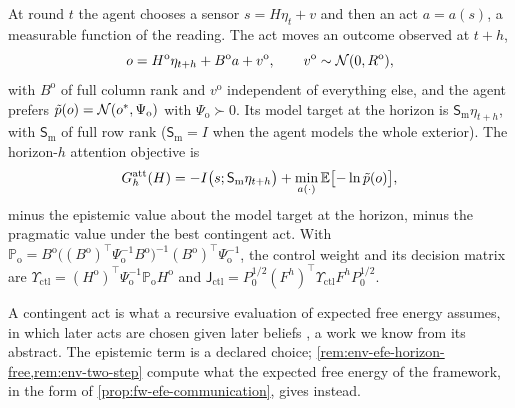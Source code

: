 \begin{definition}\label{def:env-attention-objective}
At round $t$ the agent chooses a sensor $s=H\eta_t+v$ and then an act $a=a(s)$, a measurable function of the reading. The act moves an outcome observed at $t+h$,
\[
o=H^{\mathrm o}\eta_{t+h}+B^{\mathrm o}a+v^{\mathrm o},\qquad v^{\mathrm o}\sim\mathcal{N}(0,R^{\mathrm o}),
\]
with $B^{\mathrm o}$ of full column rank and $v^{\mathrm o}$ independent of everything else, and the agent prefers $\tilde p(o)=\mathcal{N}(o^\ast,\Psi_{\mathrm o})$ with $\Psi_{\mathrm o}\succ0$. Its model target at the horizon is $\mathsf S_{\mathrm m}\eta_{t+h}$, with $\mathsf S_{\mathrm m}$ of full row rank ($\mathsf S_{\mathrm m}=I$ when the agent models the whole exterior). The horizon-$h$ attention objective is
\[
G^{\mathrm{att}}_h(H)=-I\bigl(s;\mathsf S_{\mathrm m}\eta_{t+h}\bigr)+\min_{a(\cdot)}\mathbb{E}\bigl[-\ln\tilde p(o)\bigr],
\]
minus the epistemic value about the model target at the horizon, minus the pragmatic value under the best contingent act. With $\mathbb P_{\mathrm o}=B^{\mathrm o}\bigl((B^{\mathrm o})^\top\Psi_{\mathrm o}^{-1}B^{\mathrm o}\bigr)^{-1}(B^{\mathrm o})^\top\Psi_{\mathrm o}^{-1}$, the control weight and its decision matrix are $\Upsilon_{\mathrm{ctl}}=(H^{\mathrm o})^\top\Psi_{\mathrm o}^{-1}\mathbb P_{\mathrm o}H^{\mathrm o}$ and $\mathsf J_{\mathrm{ctl}}=P_0^{1/2}(F^h)^\top\Upsilon_{\mathrm{ctl}}F^hP_0^{1/2}$.
\end{definition}

A contingent act is what a recursive evaluation of expected free energy assumes, in which later acts are chosen given later beliefs \citep{friston2021sophisticated}, a work we know from its abstract. The epistemic term is a declared choice; \cref{rem:env-efe-horizon-free,rem:env-two-step} compute what the expected free energy of the framework, in the form of \cref{prop:fw-efe-communication}, gives instead.

